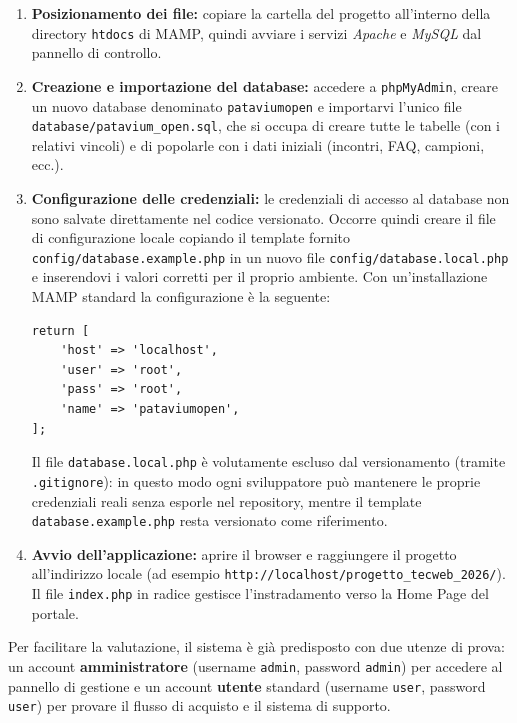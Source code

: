 \documentclass[11pt,a4paper]{article}
\begin{document}
\begin{enumerate}
    \item \textbf{Posizionamento dei file:} copiare la cartella del progetto all'interno della directory \texttt{htdocs} di MAMP, quindi avviare i servizi \textit{Apache} e \textit{MySQL} dal pannello di controllo.

    \item \textbf{Creazione e importazione del database:} accedere a \texttt{phpMyAdmin}, creare un nuovo database denominato \texttt{pataviumopen} e importarvi l'unico file \texttt{database/patavium\_open.sql}, che si occupa di creare tutte le tabelle (con i relativi vincoli) e di popolarle con i dati iniziali (incontri, FAQ, campioni, ecc.).

    \item \textbf{Configurazione delle credenziali:} le credenziali di accesso al database non sono salvate direttamente nel codice versionato. Occorre quindi creare il file di configurazione locale copiando il template fornito \texttt{config/database.example.php} in un nuovo file \texttt{config/database.local.php} e inserendovi i valori corretti per il proprio ambiente. Con un'installazione MAMP standard la configurazione è la seguente:
\begin{verbatim}
return [
    'host' => 'localhost',
    'user' => 'root',
    'pass' => 'root',
    'name' => 'pataviumopen',
];
\end{verbatim}
    Il file \texttt{database.local.php} è volutamente escluso dal versionamento (tramite \texttt{.gitignore}): in questo modo ogni sviluppatore può mantenere le proprie credenziali reali senza esporle nel repository, mentre il template \texttt{database.example.php} resta versionato come riferimento.

    \item \textbf{Avvio dell'applicazione:} aprire il browser e raggiungere il progetto all'indirizzo locale (ad esempio \texttt{http://localhost/progetto\_tecweb\_2026/}). Il file \texttt{index.php} in radice gestisce l'instradamento verso la Home Page del portale.
\end{enumerate}

Per facilitare la valutazione, il sistema è già predisposto con due utenze di prova: un account \textbf{amministratore} (username \texttt{admin}, password \texttt{admin}) per accedere al pannello di gestione e un account \textbf{utente} standard (username \texttt{user}, password \texttt{user}) per provare il flusso di acquisto e il sistema di supporto.
\end{document}
